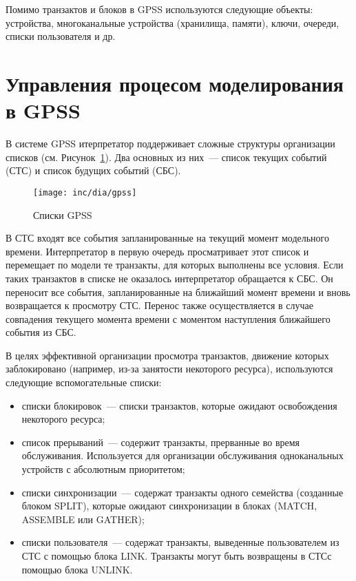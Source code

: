 Помимо транзактов и блоков в GPSS используются следующие объекты: устройства, многоканальные устройства (хранилища, памяти), ключи, очереди, списки пользователя и др.


\section{Управления процесом моделирования в GPSS}

В системе GPSS итерпретатор поддерживает сложные структуры организации списков (см. Рисунок~\ref{fig:GPSSChains}).\cite{ImitGPSS} Два основных из них~--- список текущих событий (СТС) и список будущих событий (СБС).

\begin{figure}[ht]
  \centering
  \texttt{[image: inc/dia/gpss]}
  \caption{Списки GPSS}
  \label{fig:GPSSChains}
\end{figure}

В СТС входят все события запланированные  на текущий  момент модельного времени. Интерпретатор в первую очередь просматривает этот список и перемещает по модели те транзакты, для которых выполнены все условия. Если таких транзактов в списке не оказалось интерпретатор обращается к СБС. Он переносит все события, запланированные на ближайший момент времени и вновь возвращается к просмотру СТС. Перенос также осуществляется в случае совпадения текущего момента времени с моментом наступления ближайшего события из СБС.

В целях эффективной организации просмотра транзактов, движение которых заблокировано (например, из-за занятости некоторого ресурса), используются следующие вспомогательные списки:

\begin{itemize}
\item списки блокировок~--- списки транзактов, которые ожидают освобождения некоторого ресурса;
\item список прерываний~--- содержит транзакты, прерванные во время обслуживания. Используется для организации обслуживания одноканальных устройств с абсолютным приоритетом;
\item списки синхронизации~--- содержат транзакты одного семейства (созданные блоком SPLIT), которые ожидают синхронизации в блоках (MATCH, ASSEMBLE или GATHER);
\item списки пользователя~--- содержат транзакты, выведенные пользователем из СТС с помощью блока LINK. Транзакты могут быть возвращены в СТСс помощью блока UNLINK.
\end{itemize}




